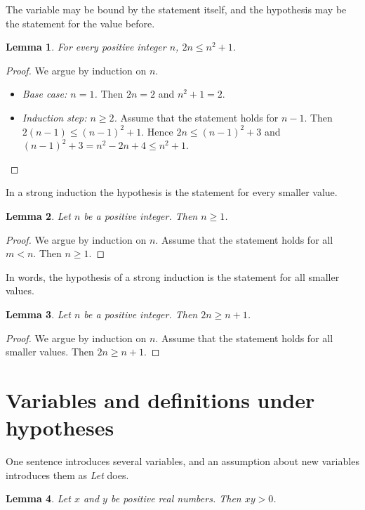 \documentclass{article}
\newtheorem{lemma}{Lemma}
\begin{document}
The variable may be bound by the statement itself, and the hypothesis may be the statement for the value before.

\begin{lemma}\label{lem:before}
For every positive integer $n$, $2n\le n^2+1$.
\end{lemma}

\begin{proof}
We argue by induction on $n$.
\begin{itemize}
\item \emph{Base case: $n=1$.} Then $2n=2$ and $n^2+1=2$.
\item \emph{Induction step: $n\ge2$.} Assume that the statement holds for $n-1$.
Then $2(n-1)\le(n-1)^2+1$.
Hence $2n\le(n-1)^2+3$ and $(n-1)^2+3=n^2-2n+4\le n^2+1$.
\end{itemize}
\end{proof}

In a strong induction the hypothesis is the statement for every smaller value.

\begin{lemma}\label{lem:strong}
Let $n$ be a positive integer.
Then $n\ge1$.
\end{lemma}

\begin{proof}
We argue by induction on $n$.
Assume that the statement holds for all $m<n$.
Then $n\ge1$.
\end{proof}

In words, the hypothesis of a strong induction is the statement for all smaller values.

\begin{lemma}\label{lem:smaller}
Let $n$ be a positive integer.
Then $2n\ge n+1$.
\end{lemma}

\begin{proof}
We argue by induction on $n$.
Assume that the statement holds for all smaller values.
Then $2n\ge n+1$.
\end{proof}

\section{Variables and definitions under hypotheses}

One sentence introduces several variables, and an assumption about new variables introduces them as \emph{Let} does.

\begin{lemma}\label{lem:several}
Let $x$ and $y$ be positive real numbers.
Then $xy>0$.
\end{lemma}
\end{document}
